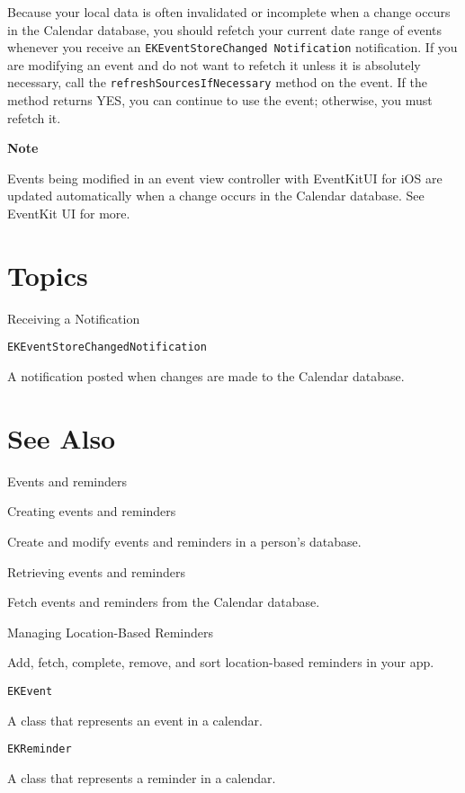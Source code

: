 \documentclass{article}
\begin{document}
Because your local data is often invalidated or incomplete when a change occurs in the Calendar database, you
should refetch your current date range of events whenever you receive an \texttt{EKEventStoreChanged
Notification} notification. If you are modifying an event and do not want to refetch it unless it is absolutely
necessary, call the \texttt{refreshSourcesIfNecessary} method on the event. If the method returns YES, you can
continue to use the event; otherwise, you must refetch it.

\textbf{Note}

Events being modified in an event view controller with EventKitUI for iOS are updated automatically when a
change occurs in the Calendar database. See EventKit UI for more.

\section*{Topics}

Receiving a Notification

\texttt{EKEventStoreChangedNotification}

A notification posted when changes are made to the Calendar database.

\section*{See Also}

Events and reminders

Creating events and reminders

Create and modify events and reminders in a person's database.

Retrieving events and reminders

Fetch events and reminders from the Calendar database.

{} Managing Location-Based Reminders

Add, fetch, complete, remove, and sort location-based reminders in your app.

\texttt{EKEvent}

A class that represents an event in a calendar.

\texttt{EKReminder}

A class that represents a reminder in a calendar.

\newpage
\end{document}
